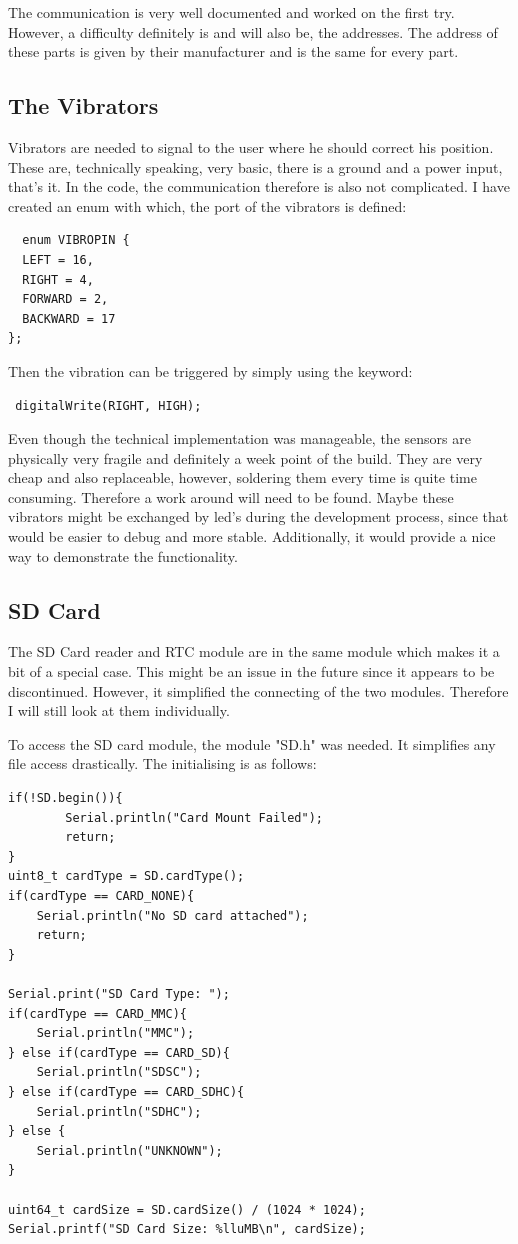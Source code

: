 The communication is very well documented \cite{ArduinoW76:online} and worked on the first try. However, a difficulty definitely is and will also be, the addresses. The address of these parts is given by their manufacturer and is the same for every part. 

\subsection{The Vibrators}

Vibrators are needed to signal to the user where he should correct his position. These are, technically speaking, very basic, there is a ground and a power input, that's it. In the code, the communication therefore is also not complicated. 
I have created an enum with which, the port of the vibrators is defined:
\begin{lstlisting}
  enum VIBROPIN {
  LEFT = 16,
  RIGHT = 4,
  FORWARD = 2,
  BACKWARD = 17
};
\end{lstlisting}
Then the vibration can be triggered by simply using the keyword:
\begin{lstlisting}
 digitalWrite(RIGHT, HIGH);
\end{lstlisting}

Even though the technical implementation was manageable, the sensors are physically very fragile and definitely a week point of the build. They are very cheap and also replaceable, however, soldering them every time is quite time consuming. Therefore a work around will need to be found. Maybe these vibrators might be exchanged by led's during the development process, since that would be easier to debug and more stable. Additionally, it would provide a nice way to demonstrate the functionality. 


\subsection{SD Card}

The SD Card reader and RTC module are in the same module which makes it a bit of a special case. This might be an issue in the future since it appears to be discontinued. However, it simplified the connecting of the two modules. Therefore I will still look at them individually. 

To access the SD card module, the module "SD.h" was needed. It simplifies any file access drastically. The initialising is as follows:

\begin{lstlisting}
if(!SD.begin()){
        Serial.println("Card Mount Failed");
        return;
}
uint8_t cardType = SD.cardType();
if(cardType == CARD_NONE){
    Serial.println("No SD card attached");
    return;
}

Serial.print("SD Card Type: ");
if(cardType == CARD_MMC){
    Serial.println("MMC");
} else if(cardType == CARD_SD){
    Serial.println("SDSC");
} else if(cardType == CARD_SDHC){
    Serial.println("SDHC");
} else {
    Serial.println("UNKNOWN");
}

uint64_t cardSize = SD.cardSize() / (1024 * 1024);
Serial.printf("SD Card Size: %lluMB\n", cardSize);
\end{lstlisting}
\cite{BlogofWe42:online}

